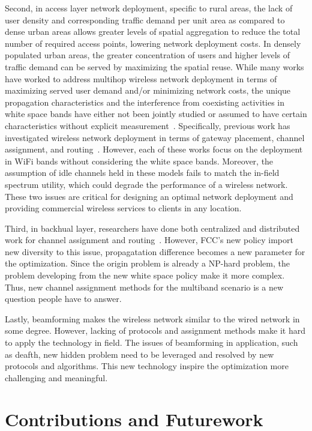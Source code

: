 Second, in access layer network deployment, specific to rural areas, 
the lack of user density and corresponding traffic
demand per unit area as compared to dense urban areas allows greater levels of
spatial aggregation to reduce the total number of required access points, lowering
network deployment costs. In densely populated urban areas, the greater concentration
of users and higher levels of traffic demand can be served by maximizing the spatial
reuse. While many works have worked to address multihop wireless network deployment
in terms of maximizing served user demand and/or minimizing network costs,
the unique propagation characteristics and the interference from coexisting
activities in white space bands have either not been jointly studied or assumed to 
have certain characteristics without explicit measurement~\cite{si2010overview}. 
Specifically, previous work has investigated wireless 
network deployment in terms of gateway placement, channel assignment, and 
routing~\cite{he2008optimizing,marina2010topology}.
However, each of these works focus on the deployment in WiFi bands without
considering the white space bands. Moreover, the assumption of idle channels
held in these models fails to match the in-field spectrum utility,
which could degrade the performance of a wireless network. These
two issues are critical for designing an optimal network deployment and
providing commercial wireless services to clients in any location.


Third, in backhual layer, researchers have done both centralized and distributed
work for channel assignment and routing~\cite{raniwala2004centralized,wu2006distributed}.
However, FCC's new policy import new diversity to this issue, propagatation
difference becomes a new parameter for the optimization. Since the origin problem
is already a NP-hard problem, the problem developing from the new white space 
policy make it more complex. Thus, new channel assignment methods for the multiband
scenario is a new question people have to answer.

Lastly, beamforming makes the wireless network similar to the wired network
in some degree. However, lacking of protocols and assignment methods make it 
hard to apply the technology in field. The issues of beamforming in application,
such as deafth, new hidden problem need to be leveraged and resolved by new
protocols and algorithms. This new technology inspire the optimization more
challenging and meaningful.


\section{Contributions and Futurework}

